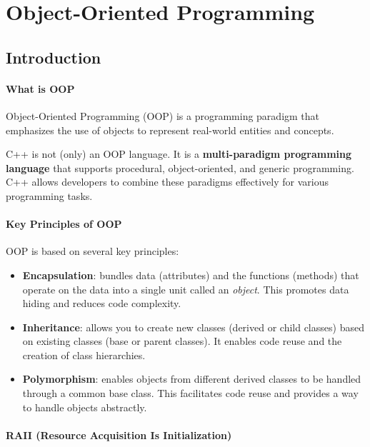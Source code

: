 \chapter{Object-Oriented Programming}

\section{Introduction}
\subsubsection{What is OOP}

Object-Oriented Programming (OOP) is a programming paradigm that emphasizes the use of objects to represent real-world entities and concepts.

\begin{definitionblock}[OOP in C++]
    C++ is not (only) an OOP language. It is a \textbf{multi-paradigm programming language} that supports procedural, object-oriented, and generic programming. 
    C++ allows developers to combine these paradigms effectively for various programming tasks.
\end{definitionblock}

\subsubsection{Key Principles of OOP}

OOP is based on several key principles:

\begin{itemize}
    \item \textbf{Encapsulation}: bundles data (attributes) and the functions (methods) that operate on the data into a single unit called an \textit{object}. This promotes data hiding and reduces code complexity.
    \item \textbf{Inheritance}: allows you to create new classes (derived or child classes) based on existing classes (base or parent classes). It enables code reuse and the creation of class hierarchies.
    \item \textbf{Polymorphism}: enables objects from different derived classes to be handled through a common base class. This facilitates code reuse and provides a way to handle objects abstractly.
\end{itemize}

\subsubsection{RAII (Resource Acquisition Is Initialization)}

